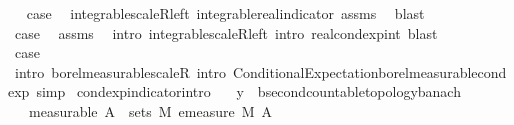 \begin{isabellebody}
\ \isamarkupfalse%
\ {\isacharquery}{\kern0pt}case\ \isamarkupfalse%
\ integrable{\isacharunderscore}{\kern0pt}scaleR{\isacharunderscore}{\kern0pt}left\ integrable{\isacharunderscore}{\kern0pt}real{\isacharunderscore}{\kern0pt}indicator\ assms\ \isamarkupfalse%
\ blast\isanewline
{}\isamarkupfalse%
\isanewline
\ \ \isamarkupfalse%
\ {}\isanewline
\ \ \isamarkupfalse%
\ {\isacharquery}{\kern0pt}case\ \isamarkupfalse%
\ assms\ \isamarkupfalse%
\ {\isacharparenleft}{\kern0pt}intro\ integrable{\isacharunderscore}{\kern0pt}scaleR{\isacharunderscore}{\kern0pt}left{\isacharcomma}{\kern0pt}\ intro\ real{\isacharunderscore}{\kern0pt}cond{\isacharunderscore}{\kern0pt}exp{\isacharunderscore}{\kern0pt}int{\isacharcomma}{\kern0pt}\ blast{\isacharplus}{\kern0pt}{\isacharparenright}{\kern0pt}\isanewline
{}\isamarkupfalse%
\isanewline
\ \ \isamarkupfalse%
\ {}\isanewline
\ \ \isamarkupfalse%
\ \isamarkupfalse%
\ {\isacharquery}{\kern0pt}case\ \isamarkupfalse%
\ {\isacharparenleft}{\kern0pt}intro\ borel{\isacharunderscore}{\kern0pt}measurable{\isacharunderscore}{\kern0pt}scaleR{\isacharcomma}{\kern0pt}\ intro\ Conditional{\isacharunderscore}{\kern0pt}Expectation{\isachardot}{\kern0pt}borel{\isacharunderscore}{\kern0pt}measurable{\isacharunderscore}{\kern0pt}cond{\isacharunderscore}{\kern0pt}exp{\isacharcomma}{\kern0pt}\ simp{\isacharparenright}{\kern0pt}\isanewline
{}\isamarkupfalse%
%
\endisatagproof
{\isafoldproof}%
%
\isadelimproof
\isanewline
%
\endisadelimproof
\isanewline
{}\isamarkupfalse%
\ cond{\isacharunderscore}{\kern0pt}exp{\isacharunderscore}{\kern0pt}indicator{\isacharbrackleft}{\kern0pt}intro{\isacharbrackright}{\kern0pt}{\isacharcolon}{\kern0pt}\isanewline
\ \ \ y\ {\isacharcolon}{\kern0pt}{\isacharcolon}{\kern0pt}\ {\isachardoublequoteopen}{\isacharprime}{\kern0pt}b{\isacharcolon}{\kern0pt}{\isacharcolon}{\kern0pt}{\isacharbraceleft}{\kern0pt}second{\isacharunderscore}{\kern0pt}countable{\isacharunderscore}{\kern0pt}topology{\isacharcomma}{\kern0pt}banach{\isacharbraceright}{\kern0pt}{\isachardoublequoteclose}\isanewline
\ \ \ {\isacharbrackleft}{\kern0pt}measurable{\isacharbrackright}{\kern0pt}{\isacharcolon}{\kern0pt}\ {\isachardoublequoteopen}A\ {\isasymin}\ sets\ M{\isachardoublequoteclose}\ {\isachardoublequoteopen}emeasure\ M\ A\ {\isacharless}{\kern0pt}\ {\isasyminfinity}{\isachardoublequoteclose}\isanewline

\end{isabellebody}
